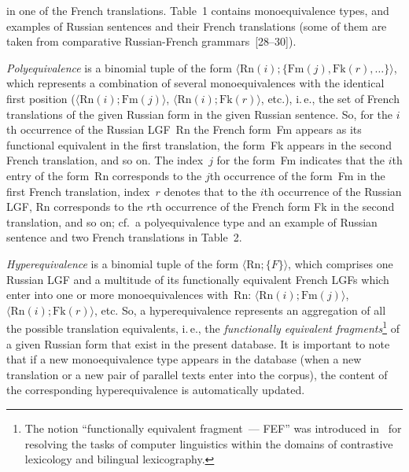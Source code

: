 \begin{multicols}{2}

\noindent 
  in one of the French translations. Table~1 contains monoequivalence types, 
and examples 
of Russian sentences and their French translations (some of them are taken from comparative 
Russian-French grammars~[28--30]).





   
   \textit{Polyequivalence} is a binomial tuple of the form $\langle \mathrm{Rn}(i); 
   \{\mathrm{Fm}(j), \mathrm{Fk}(r), 
\ldots\}\rangle$, which represents a  combination of several monoequivalences with the identical 
first position ($\langle \mathrm{Rn}(i); \mathrm{Fm}(j)\rangle$, 
$\langle \mathrm{Rn}(i); \mathrm{Fk}(r)\rangle$, etc.), i.\,e., the set of 
French translations of the given Russian form in the given Russian sentence. So, for the $i$th 
occurrence of the Russian LGF~Rn the French form~Fm appears as its functional equivalent in 
the first translation, the form~Fk appears in the second French translation, and so on.  The 
index~$j$ for the form~Fm indicates that the $i$th entry of the form~Rn corresponds to the $j$th 
occurrence of the form~Fm in the first French translation, index~$r$ denotes that to the $i$th 
occurrence of the Russian LGF, Rn corresponds to the $r$th occurrence of the French form Fk 
in the second translation, and so on; cf.\ a polyequivalence type and an example of Russian sentence 
and two French translations in Table~2.
{

}


   
   \textit{Hyperequivalence} is a binomial tuple of the form $\langle \mathrm{Rn}; \{F\}\rangle$, which 
comprises one Russian LGF and a multitude of its functionally equivalent French LGFs which enter 
into one or more monoequivalences with~Rn: $\langle \mathrm{Rn}(i); \mathrm{Fm}(j)\rangle$, 
$\langle \mathrm{Rn}(i); 
\mathrm{Fk}(r)\rangle$, etc. So, a hyperequivalence represents an aggregation of all the possible translation 
equivalents, i.\,e., the \textit{functionally equivalent fragments}\footnote{The notion ``functionally 
equivalent fragment~--- FEF'' was introduced in~\cite{2-zat} for resolving the tasks of computer linguistics 
within the domains of contrastive lexicology and bilingual lexicography.} of a given Russian form that 
exist in the present database. It is important to note that if a new monoequivalence type appears in the 
database (when a new translation or a new pair of parallel texts enter into the corpus), the content of 
the corresponding hyperequivalence is automatically updated. 




\end{multicols}
